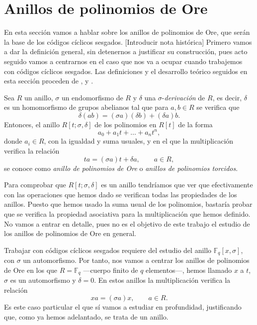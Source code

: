 \chapter{Anillos de polinomios de Ore}

En esta sección vamos a hablar sobre los anillos de polinomios de Ore, que serán la base de los códigos cíclicos sesgados.
[Introducir nota histórica]
Primero vamos a dar la definición general, sin detenernos a justificar su construcción, pues acto seguido vamos a centrarnos en el caso que nos va a ocupar cuando trabajemos con códigos cíclicos sesgados.
Las definiciones y el desarrollo teórico seguidos en esta sección proceden de \parencite{jacobson_finite-dimensional_1996}, \parencite{ore_theory_1933} y \parencite{gomez-torrecillas_factoring_2020}.

\begin{definition}
  Sea \(R\) un anillo, \(\sigma\) un endomorfismo de \(R\) y \(\delta\) una \(\sigma\)-\textit{derivación} de \(R\), es decir, \(\delta\) es un homomorfismo de grupos abelianos tal que para \(a, b \in R\) se verifica que
  \[
    \delta(ab) = (\sigma a)(\delta b) + (\delta a)b.
  \]
  Entonces, el anillo \(R[t; \sigma, \delta]\) de los polinomios en \(R[t]\) de la forma
  \[
    a_0 + a_1t + \dots + a_nt^n,
  \]
  donde \(a_i \in R\), con la igualdad y suma usuales, y en el que la multiplicación verifica la relación 
  \[
  ta = (\sigma a)t + \delta a, \qquad a \in R,
  \]
  se conoce como \textit{anillo de polinomios de Ore} o \textit{anillos de polinomios torcidos}.
\end{definition}

Para comprobar que \(R[t; \sigma, \delta]\) es un anillo tendríamos que ver que efectivamente con las operaciones que hemos dado se verifican todas las propiedades de los anillos.
Puesto que hemos usado la suma usual de los polinomios, bastaría probar que se verifica la propiedad asociativa para la multiplicación que hemos definido.
No vamos a entrar en detalle, pues no es el objetivo de este trabajo el estudio de los anillos de polinomios de Ore en general.

Trabajar con códigos cíclicos sesgados requiere del estudio del anillo \(\mathbb F_q[x, \sigma]\), con \(\sigma\) un automorfismo.
Por tanto, nos vamos a centrar los anillos de polinomios de Ore en los que \(R = \mathbb F_q\) —cuerpo finito de \(q\) elementos—, hemos llamado \(x\) a \(t\), \(\sigma\) es un automorfismo y \(\delta = 0\).
En estos anillos la multiplicación verifica la relación 
\[
  xa = (\sigma a)x, \qquad a \in R.
\]
Es este caso particular el que sí vamos a estudiar en profundidad, justificando que, como ya hemos adelantado, se trata de un anillo.

